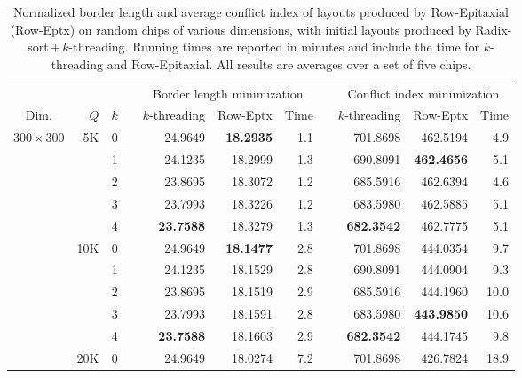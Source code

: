 \begin{table}[p!]\centering
\caption{\label{tab:reptx}
  Normalized border length and average conflict index of layouts produced by
  Row-Epitaxial (Row-Eptx) on random chips of various dimensions, with initial
  layouts produced by Radix-sort\,+\,$k$-threading. Running times are reported
  in minutes and include the time for $k$-threading and Row-Epitaxial. All
  results are averages over a set of five chips.}
\footnotesize{
\begin{tabular*}{\hsize}{crrlrrrlrrr}
\vspace{1pt}
     &     &     & & \multicolumn{3}{c}{Border length minimization} & & \multicolumn{3}{c}{Conflict index minimization} \\ \cline{5-7} \cline{9-11}
\vspace{1pt}
Dim. & $Q$ & $k$ & & $k$-threading & Row-Eptx & Time                & & $k$-threading & Row-Eptx & Time \\
\hline
$300\times 300$ &  5K & 0 &   &      24.9649  & {\bf 18.2935} &  1.1 &  &      701.8698  &      462.5194  &   4.9 \\
                &     & 1 &   &      24.1235  &      18.2999  &  1.3 &  &      690.8091  & {\bf 462.4656} &   5.1 \\
                &     & 2 &   &      23.8695  &      18.3072  &  1.2 &  &      685.5916  &      462.6394  &   4.6 \\
                &     & 3 &   &      23.7993  &      18.3226  &  1.2 &  &      683.5980  &      462.5885  &   5.1 \\
                &     & 4 &   & {\bf 23.7588} &      18.3279  &  1.3 &  & {\bf 682.3542} &      462.7775  &   5.1 \\
\cline{2-11}
                & 10K & 0 &   &      24.9649  & {\bf 18.1477} &  2.8 &  &      701.8698  &      444.0354  &   9.7 \\
                &     & 1 &   &      24.1235  &      18.1529  &  2.8 &  &      690.8091  &      444.0904  &   9.3 \\
                &     & 2 &   &      23.8695  &      18.1519  &  2.9 &  &      685.5916  &      444.1960  &  10.0 \\
                &     & 3 &   &      23.7993  &      18.1591  &  2.8 &  &      683.5980  & {\bf 443.9850} &  10.6 \\
                &     & 4 &   & {\bf 23.7588} &      18.1603  &  2.9 &  & {\bf 682.3542} &      444.1745  &   9.8 \\
\cline{2-11}
                & 20K & 0 &   &      24.9649  &      18.0274  &  7.2 &  &      701.8698  &      426.7824  &  18.9 \\

\end{tabular*}}
\end{table}
